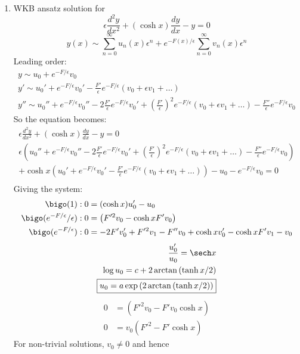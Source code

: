 \documentclass{X:/Documents/Coding/Latex/myassignment}
\begin{document}
\begin{enumerate}
\begin{enumerate}
		\item WKB ansatz solution for
		\[\epsilon \frac{d^2y}{dx^2} + (\cosh x) \frac{dy}{dx} - y= 0\]
		\[y(x) \sim \sum_{n=0}^\infty u_n(x) \epsilon^n + e^{-F(x)/\epsilon} \sum_{n=0}^\infty v_n(x) \epsilon^{n}\] 
		Leading order:
		\begin{align*}
			y \sim u_0 + e^{-F/\epsilon} v_0\\
			y' \sim u_0' + e^{-F/\epsilon} v_0' - \frac{F'}{\epsilon} e^{-F/\epsilon}(v_0 + \epsilon v_1 + \hdots)\\
			y'' \sim u_0'' + e^{-F/\epsilon} v_0'' - 2\frac{F'}{\epsilon}e^{-F/\epsilon} v_0' + \left(\frac{F'}{\epsilon}\right)^2 e^{-F/\epsilon} \left(v_0 + \epsilon v_1 + \ldots\right) - \frac{F''}{\epsilon} e^{-F/\epsilon} v_0
		\end{align*}
		So the equation becomes:
		\begin{align*}
			\epsilon \frac{d^2y}{dx^2} + (\cosh x) \frac{dy}{dx} - y= 0\\
			\epsilon\left(u_0'' + e^{-F/\epsilon} v_0'' - 2\frac{F'}{\epsilon}e^{-F/\epsilon} v_0' + \left(\frac{F'}{\epsilon}\right)^2 e^{-F/\epsilon} \left(v_0 + \epsilon v_1 + \ldots\right) - \frac{F''}{\epsilon} e^{-F/\epsilon} v_0\right)\\
			+ \cosh x\left(u_0' + e^{-F/\epsilon} v_0' - \frac{F'}{\epsilon} e^{-F/\epsilon}(v_0 + \epsilon v_1 + \hdots)\right) - u_0 - e^{-F/\epsilon} v_0 =0\\
		\end{align*}
		Giving the system:
		\begin{align*}
			\bigo(1):0&=(\cosh x) u_0' - u_0 \\
			\bigo(e^{-F/\epsilon}/\epsilon):0&=\left(F'^2v_0  -\cosh x F' v_0\right)\\
			\bigo(e^{-F/\epsilon}): 0&=-2F'v_0' + F'^2 v_1 - F''v_0 +\cosh x v_0' -\cosh x F' v_1 - v_0\\
		\end{align*}
		\begin{align*}
			\frac{u_0'}{u_0} = \sech x\\
			\log u_0 =c+ 2\arctan\left(\tanh x/2\right)\\
			\boxed{u_0 =a\exp\left(2\arctan\left(\tanh x/2\right)\right)}
		\end{align*}
		\begin{align*}
			0&=\left(F'^2v_0  -F'v_0\cosh x  \right)\\
			0&= v_0\left(F'^2  - F'\cosh x\right)			
		\end{align*}
		For non-trivial solutions, $v_0\neq 0$ and hence

\end{enumerate}
\end{enumerate}
\end{document}
